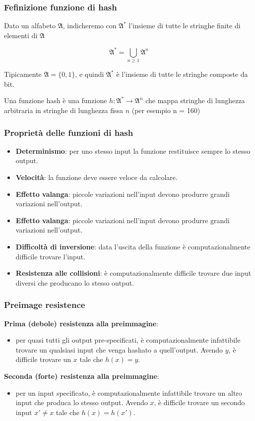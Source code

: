 \begin{frame}
	\frametitle{Fefinizione funzione di hash}

	Dato un alfabeto $\mathfrak{A}$, indicheremo con $\mathfrak{A}^*$ l’insieme di tutte le stringhe finite di elementi di $\mathfrak{A}$

	\[
		\mathfrak{A}^* = \bigcup_{n \geq 1} \mathfrak{A}^n
	\]

	Tipicamente $\mathfrak{A} = \{0, 1\}$, e quindi $\mathfrak{A}^*$ è l’insieme di tutte le stringhe composte da bit.

	\vspace{1cm}
	Una funzione hash è una funzione $h : \mathfrak{A}^* \rightarrow \mathfrak{A}^n$ che mappa stringhe di lunghezza arbitraria in stringhe di lunghezza fissa $n$ (per esempio n = 160)

\end{frame}


\begin{frame}
	\frametitle{Proprietà delle funzioni di hash}

	\begin{itemize}
		\item \textbf{Determinismo}: per uno stesso input la funzione restituisce sempre lo stesso output.
		\item \textbf{Velocità}: la funzione deve essere veloce da calcolare.
		\item \textbf{Effetto valanga}: piccole variazioni nell'input devono produrre grandi variazioni nell'output.
		\item \textbf{Effetto valanga}: piccole variazioni nell'input devono produrre grandi variazioni nell'output.
		\item \textbf{Difficoltà di inversione}: data l'uscita della funzione è computazionalmente difficile trovare l'input.
		\item \textbf{Resistenza alle collisioni}: è computazionalmente difficile trovare due input diversi che producano lo stesso output.
	\end{itemize}
\end{frame}

\begin{frame}
	\frametitle{Preimage resistence}
	\textbf{Prima (debole) resistenza alla preimmagine}:
	\begin{itemize}
		\item per quasi tutti gli output pre-specificati, è computazionalmente infattibile trovare un qualsiasi input che venga hashato a quell'output.
		      Avendo \( y \), è difficile trovare un \( x \) tale che \( h(x) = y \).
	\end{itemize}
	\textbf{Seconda (forte) resistenza alla preimmagine}:
	\begin{itemize}
		\item per un input specificato, è computazionalmente infattibile trovare un altro input che produca lo stesso output.
		      Avendo \( x \), è difficile trovare un secondo input \( x' \neq x \) tale che \( h(x) = h(x') \).
	\end{itemize}

\end{frame}

